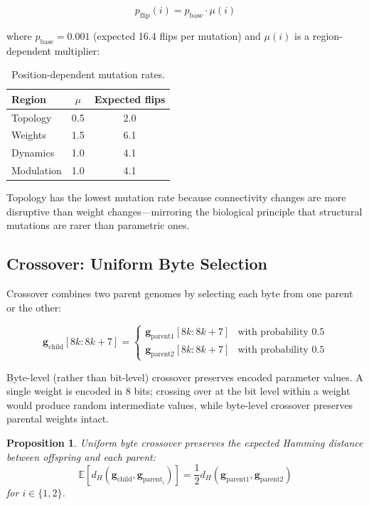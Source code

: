 \documentclass[11pt,a4paper]{article}
\newtheorem{proposition}{Proposition}
\begin{document}
\begin{equation}
p_{\text{flip}}(i) = p_{\text{base}} \cdot \mu(i)
\end{equation}

where $p_{\text{base}} = 0.001$ (expected 16.4 flips per mutation) and $\mu(i)$ is a region-dependent multiplier:

\begin{table}[h]
\centering
\caption{Position-dependent mutation rates.}
\label{tab:mutation}
\begin{tabular}{@{}lcc@{}}
\toprule
Region & $\mu$ & Expected flips \\
\midrule
Topology & 0.5 & 2.0 \\
Weights & 1.5 & 6.1 \\
Dynamics & 1.0 & 4.1 \\
Modulation & 1.0 & 4.1 \\
\bottomrule
\end{tabular}
\end{table}

Topology has the lowest mutation rate because connectivity changes are more disruptive than weight changes---mirroring the biological principle that structural mutations are rarer than parametric ones.

\subsection{Crossover: Uniform Byte Selection}

Crossover combines two parent genomes by selecting each byte from one parent or the other:

\begin{equation}
\mathbf{g}_{\text{child}}[8k : 8k+7] = \begin{cases}
\mathbf{g}_{\text{parent1}}[8k : 8k+7] & \text{with probability } 0.5 \\
\mathbf{g}_{\text{parent2}}[8k : 8k+7] & \text{with probability } 0.5
\end{cases}
\end{equation}

Byte-level (rather than bit-level) crossover preserves encoded parameter values. A single weight is encoded in 8 bits; crossing over at the bit level within a weight would produce random intermediate values, while byte-level crossover preserves parental weights intact.

\begin{proposition}
Uniform byte crossover preserves the expected Hamming distance between offspring and each parent:
\begin{equation}
\mathbb{E}[d_H(\mathbf{g}_{\text{child}}, \mathbf{g}_{\text{parent}_i})] = \frac{1}{2} d_H(\mathbf{g}_{\text{parent1}}, \mathbf{g}_{\text{parent2}})
\end{equation}
for $i \in \{1, 2\}$.
\end{proposition}
\end{document}
